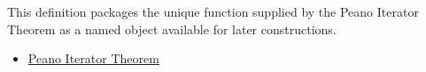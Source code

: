 \begin{remark*}[Interpretation]
This definition packages the unique function supplied by the Peano Iterator
Theorem as a named object available for later constructions.
\end{remark*}

\begin{dependencies}
\begin{itemize}
  \item \hyperref[thm:peano-iterator-theorem]{Peano Iterator Theorem}
\end{itemize}
\end{dependencies}

